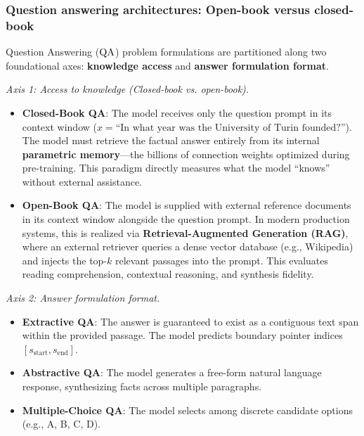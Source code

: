 \documentclass[../../main.tex]{subfiles}
\begin{document}
\subsubsection{Question answering architectures: Open-book versus closed-book}
\label{subsec:question_answering}
Question Answering ($\mathrm{QA}$) problem formulations are partitioned along two foundational axes: \textbf{knowledge access} and \textbf{answer formulation format}.

\textit{Axis 1: Access to knowledge (Closed-book vs. open-book).}
\begin{itemize}
    \item \textbf{Closed-Book QA}: The model receives only the question prompt in its context window ($x = \text{``In what year was the University of Turin founded?''}$). The model must retrieve the factual answer entirely from its internal \textbf{parametric memory}---the billions of connection weights optimized during pre-training. This paradigm directly measures what the model ``knows'' without external assistance.
    \item \textbf{Open-Book QA}: The model is supplied with external reference documents in its context window alongside the question prompt. In modern production systems, this is realized via \textbf{Retrieval-Augmented Generation (RAG)}, where an external retriever queries a dense vector database (e.g., Wikipedia) and injects the top-$k$ relevant passages into the prompt. This evaluates reading comprehension, contextual reasoning, and synthesis fidelity.
\end{itemize}

\textit{Axis 2: Answer formulation format.}
\begin{itemize}
    \item \textbf{Extractive QA}: The answer is guaranteed to exist as a contiguous text span within the provided passage. The model predicts boundary pointer indices $[s_{\text{start}}, s_{\text{end}}]$.
    \item \textbf{Abstractive QA}: The model generates a free-form natural language response, synthesizing facts across multiple paragraphs.
    \item \textbf{Multiple-Choice QA}: The model selects among discrete candidate options (e.g., A, B, C, D).
\end{itemize}
\end{document}
